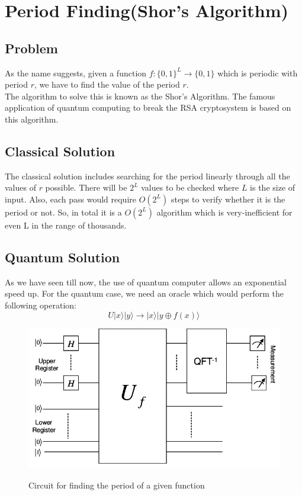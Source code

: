 \section{Period Finding(Shor's Algorithm)}
\subsection{Problem}
As the name suggests, given a function $f: \{0,1\}^L \rightarrow \{0,1\}$ which is periodic with period $r$, we have to find the value of the period $r$. \\
The algorithm to solve this is known as the Shor's Algorithm. The famous application of quantum computing to break the RSA cryptosystem is based on this algorithm.
\subsection{Classical Solution}
The classical solution includes searching for the period linearly through all the values of $r$ possible. There will be $2^L$ values to be checked where $L$ is the size of input. Also, each pass would require $O(2^L)$ steps to verify whether it is the period or not. So, in total it is a $O(2^L)$ algorithm which is very-inefficient for even L in the range of thousands.
\subsection{Quantum Solution}
As we have seen till now, the use of quantum computer allows an exponential speed up. For the quantum case, we need an oracle which would perform the following operation:
\begin{equation}
U|x\rangle |y\rangle \rightarrow |x\rangle |y \oplus  f(x)\rangle
\end{equation}
\begin{figure}[h]
\centering
\includegraphics[width=1\textwidth]{images/shor.png}
\label{shor}
\caption{Circuit for finding the period of a given function}
\end{figure}

